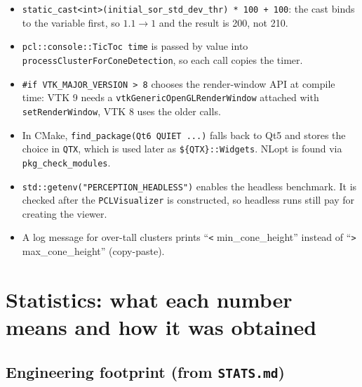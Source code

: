 \documentclass[10pt,a4paper]{scrartcl}
\renewcommand{\emph}[1]{\textcolor{accent}{#1}}
\newcommand{\code}[1]{\texttt{#1}}
\newcommand{\RuleSection}[1]{%
    \section{#1}%
    \vspace{0.2em}{\color{accent!35}\hrule height 0.4pt}\vspace{0.3em}%
  }
\begin{document}
  \begin{itemize}\sloppy
    \item \code{static\_cast<int>(initial\_sor\_std\_dev\_thr) * 100 + 100}: the cast
      binds to the variable first, so $1.1\to1$ and the result is 200, not 210.
    \item \code{pcl::console::TicToc time} is passed \emph{by value} into
      \code{processClusterForConeDetection}, so each call copies the timer.
    \item \code{\#if VTK\_MAJOR\_VERSION > 8} chooses the render-window API at compile
      time: VTK 9 needs a \code{vtkGenericOpenGLRenderWindow} attached with
      \code{setRenderWindow}, VTK 8 uses the older calls.
    \item In CMake, \code{find\_package(Qt6 QUIET ...)} falls back to Qt5 and stores
      the choice in \code{QTX}, which is used later as \code{\$\{QTX\}::Widgets}. NLopt is
      found via \code{pkg\_check\_modules}.
    \item \code{std::getenv("PERCEPTION\_HEADLESS")} enables the headless benchmark. It is
      checked \emph{after} the \code{PCLVisualizer} is constructed, so headless runs still
      pay for creating the viewer.
    \item A log message for over-tall clusters prints ``\code{<} min\_cone\_height''
      instead of ``\code{>} max\_cone\_height'' (copy-paste).
  \end{itemize}

  \RuleSection{Statistics: what each number means and how it was obtained}
  \label{sec:stats}

  \subsection{Engineering footprint (from \texttt{STATS.md})}
\end{document}
